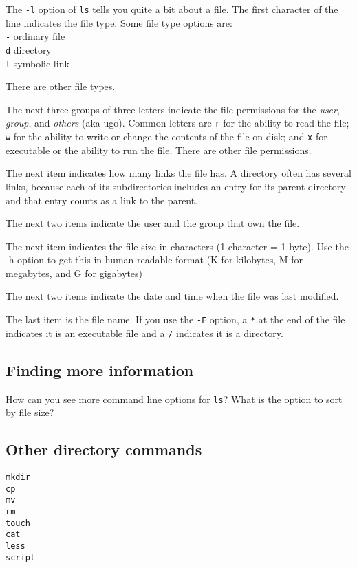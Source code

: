 \documentclass[12pt,hidelinks]{article}
\begin{document}
\begin{appendices}
The \texttt{-l} option of \texttt{ls} tells you quite a bit about a file. The first character of the line indicates the file type. Some file type options are:
\\\texttt{-} ordinary file
\\\texttt{d} directory
\\\texttt{l} symbolic link

There are other file types.

The next three groups of three letters indicate the file permissions for the \emph{user}, \emph{group}, and \emph{others} (aka ugo). Common letters are \texttt{r} for the ability to read the file; \texttt{w} for the ability to write or change the contents of the file on disk; and \texttt{x} for executable or the ability to run the file. There are other file permissions.

The next item indicates how many links the file has. A directory often has several links, because each of its subdirectories includes an entry for its parent directory and that entry counts as a link to the parent.

The next two items indicate the user and the group that own the file.

The next item indicates the file size in characters (1 character = 1 byte). Use the -h option to get this in human readable format (K for kilobytes, M for megabytes, and G for gigabytes)

The next two items indicate the date and time when the file was last modified.

The last item is the file name. If you use the \texttt{-F} option, a \texttt{*} at the end of the file indicates it is an executable file and a \texttt{/} indicates it is a directory.


\subsection*{Finding more information}

How can you see more command line options for \texttt{ls}? What is the option to sort by file size?


\subsection{Other directory commands}

\begin{lstlisting}[style=bash]
mkdir 
cp
mv
rm
touch
cat
less
script
\end{lstlisting}


\end{appendices}
\end{document}
